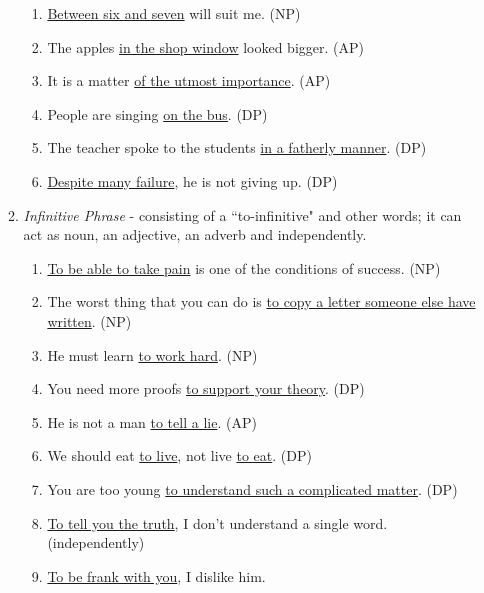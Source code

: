\begin{enumerate}
\begin{enumerate}
\begin{enumerate}
                    \item \underline{Between six and seven} will suit me. (NP)
                    \item The apples \underline{in the shop window} looked
                        bigger. (AP)
                    \item It is a matter \underline{of the utmost importance}.
                        (AP)
                    \item People are singing \underline{on the bus}. (DP)
                    \item The teacher spoke to the students \underline{in a
                        fatherly manner}. (DP)
                    \item \underline{Despite many failure}, he is not giving up.
                        (DP)
                \end{enumerate}
            \item
                {\it
                Infinitive Phrase
                }
                - consisting of a ``to-infinitive" and other words; it can act
                as noun, an adjective, an adverb and independently.
                \begin{enumerate}
                    \item \underline{To be able to take pain} is one of the
                        conditions of success. (NP)
                    \item The worst thing that you can do is \underline{to copy
                        a letter someone else have written}. (NP)
                    \item He must learn \underline{to work hard}. (NP)
                    \item You need more proofs \underline{to support your
                        theory}. (DP)
                    \item He is not a man \underline{to tell a lie}. (AP)
                    \item We should eat \underline{to live}, not live
                        \underline{to eat}. (DP)
                    \item You are too young \underline{to understand such a
                        complicated matter}. (DP)
                    \item \underline{To tell you the truth}, I don't understand
                        a single word. (independently)
                    \item \underline{To be frank with you}, I dislike him.

\end{enumerate}
\end{enumerate}
\end{enumerate}
